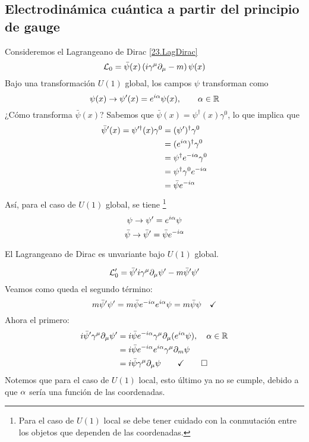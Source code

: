 \subsection{Electrodinámica cuántica a partir del principio de gauge}
Consideremos el Lagrangeano de Dirac \eqref{23.LagDirac}
\begin{equation}
  \mathcal{L} _0=\bar{\psi}(x)\left(i\gamma^\mu \partial_\mu -m\right)\psi(x)
\end{equation}
Bajo una transformación $U(1)$ global, los campos $\psi$ transforman como
\begin{equation}
  \psi(x)\to \psi'(x)=e^{i\alpha }\psi(x),\qquad \alpha\in\mathbb{R}
\end{equation}
¿Cómo transforma $\bar{\psi}(x)$? Sabemos que $\bar{\psi}(x)=\psi^\dagger(x)\gamma^0 $, lo que implica que
\begin{align}
  \bar{\psi}'(x)=\psi'^\dagger(x)\gamma^0 &=(\psi')^\dagger\gamma^0 \\
  &=(e^{i\alpha })^\dagger \gamma^0 \\
  &=\psi^\dagger e^{-i\alpha }\gamma^0 \\
  &=\psi^\dagger \gamma^0 e^{-i\alpha }\\
  &=\bar{\psi}e^{-i\alpha }
\end{align}
Así, para el caso de $U(1)$ global, se tiene \footnote{Para el caso de $U(1)$ local se debe tener cuidado con la conmutación entre los objetos que dependen de las coordenadas.}
\begin{equation}
  \psi\to \psi'=e^{i\alpha }\psi
\end{equation}
\begin{equation}
  \bar{\psi}\to \bar{\psi}'=\bar{\psi}e^{-i\alpha }
\end{equation}

\begin{teor}
	El Lagrangeano de Dirac es unvariante bajo $U(1)$ global.
\end{teor}
\begin{prueba}
	\begin{equation}
  \mathcal{L}'_0 =\bar{\psi}'i\gamma^\mu\partial_\mu \psi'-m\bar{\psi}'\psi'
\end{equation}
Veamos como queda el segundo término:
\begin{equation}
  m\bar{\psi}'\psi'=m\bar{\psi}e^{-i\alpha }e^{i\alpha }\psi=m\bar{\psi}\psi \quad \checkmark
\end{equation}
Ahora el primero:
\begin{align}
  i\bar{\psi}'\gamma^\mu \partial_\mu \psi'&=i\bar{\psi}e^{-i\alpha }\gamma^\mu \partial_\mu (e^{i\alpha }\psi),\quad \alpha\in\mathbb{R}\\
  &=i\bar{\psi}e^{-i\alpha }e^{i\alpha }\gamma^\mu \partial_m \psi\\
  &=i\bar{\psi}\gamma^\mu \partial_\mu \psi\qquad \checkmark \qed 
\end{align}
Notemos que para el caso de $U(1)$ local, esto último ya no se cumple, debido a que $\alpha$ sería una función de las coordenadas.
\end{prueba}


